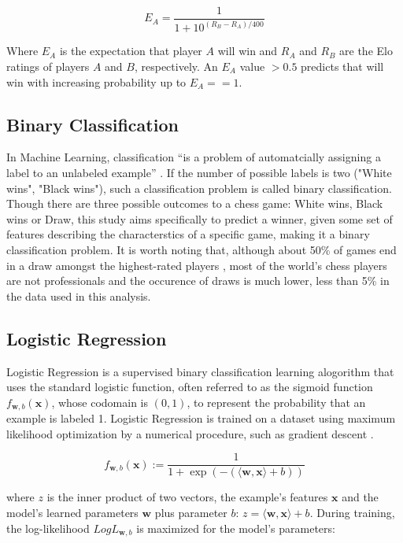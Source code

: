 \documentclass[12pt]{article}
\begin{document}
\[
E_A = \frac{1}{1 + 10^{(R_B - R_A)/400}}
\]

Where $E_A$ is the expectation that player $A$ will win and $R_A$ and $R_B$ are the Elo ratings of players $A$ and $B$, respectively. An $E_A$ value $> 0.5$ predicts that will win with increasing probability up to $E_A == 1$.

\subsection{Binary Classification}

In Machine Learning, classification ``is a problem of automatcially assigning a label to an unlabeled example'' \cite[Chapter 2, Section 2.7]{100MLB}. If the number of possible labels is two ("White wins", "Black wins"), such a classification problem is called binary classification. Though there are three possible outcomes to a chess game: White wins, Black wins or Draw, this study aims specifically to predict a winner, given some set of features describing the characterstics of a specific game, making it a binary classification problem. It is worth noting that, although about 50\% of games end in a draw amongst the highest-rated players \cite{chessBaseDraws}, most of the world's chess players are not professionals and the occurence of draws is much lower, less than 5\% in the data used in this analysis.

\subsection{Logistic Regression}

Logistic Regression is a supervised binary classification learning alogorithm that uses the standard logistic function, often referred to as the sigmoid function $f_{\textbf{w},b}(\textbf{x})$, whose codomain is $(0, 1)$, to represent the probability that an example is labeled 1. Logistic Regression is trained on a dataset using maximum likelihood optimization by a numerical procedure, such as gradient descent \cite[Chapter 9, Section 9.3]{ShalevShwartz2014}.

\[
f_{\textbf{w},b}(\textbf{x}) := \frac{1}{1 + \exp(-(\langle\textbf{w}, \textbf{x}\rangle + b))}
\]

where $z$ is the inner product of two vectors, the example's features $\textbf{x}$ and the model's learned parameters $\textbf{w}$ plus parameter $b$: $z = \langle\textbf{w}, \textbf{x}\rangle + b$. During training, the log-likelihood $LogL_{\textbf{w},b}$ is maximized for the model's parameters:
\end{document}
